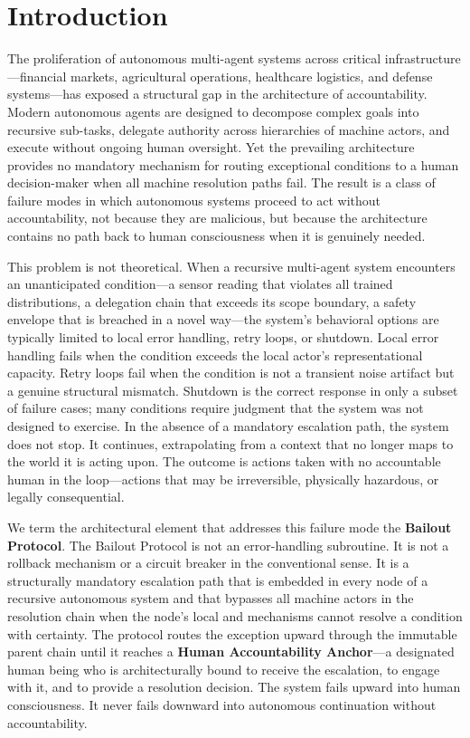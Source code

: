 \section{Introduction}

The proliferation of autonomous multi-agent systems across critical infrastructure—financial markets, agricultural operations, healthcare logistics, and defense systems—has exposed a structural gap in the architecture of accountability. Modern autonomous agents are designed to decompose complex goals into recursive sub-tasks, delegate authority across hierarchies of machine actors, and execute without ongoing human oversight. Yet the prevailing architecture provides no mandatory mechanism for routing exceptional conditions to a human decision-maker when all machine resolution paths fail. The result is a class of failure modes in which autonomous systems proceed to act without accountability, not because they are malicious, but because the architecture contains no path back to human consciousness when it is genuinely needed.

This problem is not theoretical. When a recursive multi-agent system encounters an unanticipated condition—a sensor reading that violates all trained distributions, a delegation chain that exceeds its scope boundary, a safety envelope that is breached in a novel way—the system's behavioral options are typically limited to local error handling, retry loops, or shutdown. Local error handling fails when the condition exceeds the local actor's representational capacity. Retry loops fail when the condition is not a transient noise artifact but a genuine structural mismatch. Shutdown is the correct response in only a subset of failure cases; many conditions require judgment that the system was not designed to exercise. In the absence of a mandatory escalation path, the system does not stop. It continues, extrapolating from a context that no longer maps to the world it is acting upon. The outcome is actions taken with no accountable human in the loop—actions that may be irreversible, physically hazardous, or legally consequential.

We term the architectural element that addresses this failure mode the \textbf{Bailout Protocol}. The Bailout Protocol is not an error-handling subroutine. It is not a rollback mechanism or a circuit breaker in the conventional sense. It is a structurally mandatory escalation path that is embedded in every node of a recursive autonomous system and that bypasses all machine actors in the resolution chain when the node's local \purpose and \bounds mechanisms cannot resolve a condition with certainty. The protocol routes the exception upward through the immutable parent chain until it reaches a \textbf{Human Accountability Anchor}—a designated human being who is architecturally bound to receive the escalation, to engage with it, and to provide a resolution decision. The system fails upward into human consciousness. It never fails downward into autonomous continuation without accountability.

